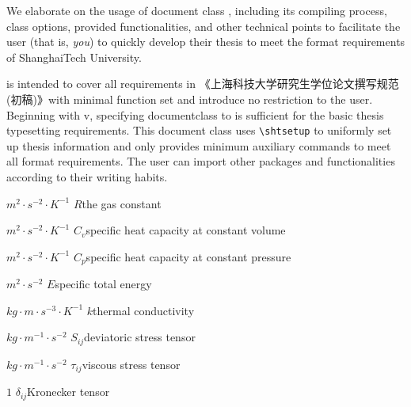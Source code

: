 \documentclass[bachelor, comfort]{shtthesis}
\makeatletter
\def\ifundergraduate{\ifsht@undergraduate}
\makeatother
\begin{document}
\maketitle

\frontmatter
\begin{abstract}[flattitle]
  本文档阐述 \shtthesis 的使用方法，包括其编译方式、文档类选项、文档类提供的功能及其他便于用户（\emph{也就是正在阅读这篇文档的您}）快速撰写符合上海科技大学要求的学位论文的技术要点。

  \shtthesis 旨在以最简实现和最小依赖完整覆盖《上海科技大学研究生学位论文撰写规范（初稿）》的所有格式要求，且不为用户额外设限。从 v\version 起，仅需指定 documentclass 为 \shtthesis 即可满足基本排版要求。文档通过 \verb|\shtsetup| 命令统一设定学位论文信息，且仅提供满足格式需求的最少额外命令以保证兼容性。用户可根据自身撰文习惯，引入额外的宏包和命令完成学位论文撰写。
\end{abstract}

\begin{abstract*}[flattitle]
  We elaborate on the usage of document class \shtthesis, including its compiling process, class options, provided functionalities, and other technical points to facilitate the user (that is, \emph{you}) to quickly develop their thesis to meet the format requirements of ShanghaiTech University. 

  \shtthesis is intended to cover all requirements in 《上海科技大学研究生学位论文撰写规范(初稿)》with minimal function set and introduce no restriction to the user. Beginning with v\version, specifying documentclass to \shtthesis is suﬀicient for the basic thesis typesetting requirements. This document class uses \verb|\shtsetup| to uniformly set up thesis information and only provides minimum auxiliary commands to meet all format requirements. The user can import other packages and functionalities according to their writing habits. 
\end{abstract*}

\makeindices

\ifundergraduate
\else
\begin{nomenclatures}
  \item[${m^{2} \cdot s^{-2} \cdot K^{-1}}$]{$R$}{the gas constant}
  \item[${m^{2} \cdot s^{-2} \cdot K^{-1}}$]{$C_v$}{specific heat capacity at constant volume}
  \item[${m^{2} \cdot s^{-2} \cdot K^{-1}}$]{$C_p$}{specific heat capacity at constant pressure}
  \item[${m^{2} \cdot s^{-2}}$]{$E$}{specific total energy}
  \item[${kg \cdot m \cdot s^{-3} \cdot K^{-1}}$]{$k$}{thermal conductivity}
  \item[${kg \cdot m^{-1} \cdot s^{-2}}$]{$S_{ij}$}{deviatoric stress tensor}
  \item[${kg \cdot m^{-1} \cdot s^{-2}}$]{$\tau_{ij}$}{viscous stress tensor}
  \item[${1}$]{$\delta_{ij}$}{Kronecker tensor}
\end{nomenclatures}
\end{document}

